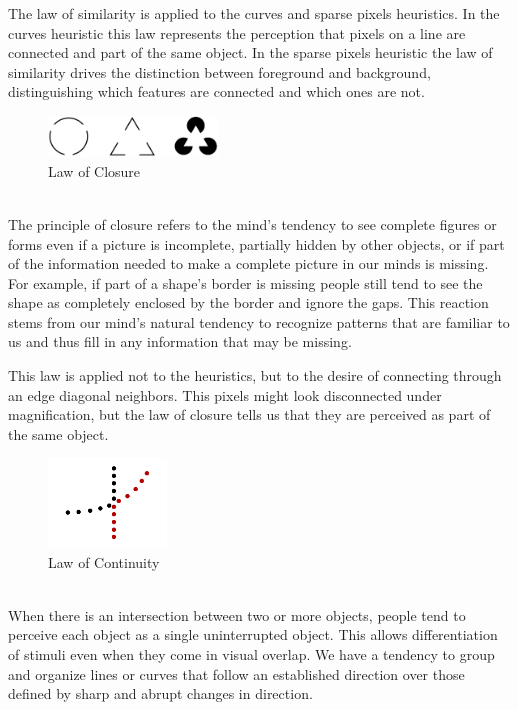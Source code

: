 \documentclass[]{usiinfbachelorproject}
\begin{document}
The law of similarity is applied to the curves and sparse pixels heuristics. In the curves heuristic this law represents the perception that pixels on a line are connected and part of the same object. In the sparse pixels heuristic the law of similarity drives the distinction between foreground and background, distinguishing which features are connected and which ones are not.\\

\begin{figure}
	\centering
	\vspace{0.5cm}
	\includegraphics[width=0.4\textwidth]{img/gestalt_closure.png}
	\caption*{Law of Closure}
\end{figure}

\\
The principle of closure refers to the mind's tendency to see complete figures or forms even if a picture is incomplete, partially hidden by other objects, or if part of the information needed to make a complete picture in our minds is missing. For example, if part of a shape's border is missing people still tend to see the shape as completely enclosed by the border and ignore the gaps. This reaction stems from our mind's natural tendency to recognize patterns that are familiar to us and thus fill in any information that may be missing.

This law is applied not to the heuristics, but to the desire of connecting through an edge diagonal neighbors. This pixels might look disconnected under magnification, but the law of closure tells us that they are perceived as part of the same object.\\

\begin{figure}
	\centering
	\includegraphics[width=0.28\textwidth]{img/gestalt_continuity.png}
	\caption*{Law of Continuity}
\end{figure}

\\
When there is an intersection between two or more objects, people tend to perceive each object as a single uninterrupted object. This allows differentiation of stimuli even when they come in visual overlap. We have a tendency to group and organize lines or curves that follow an established direction over those defined by sharp and abrupt changes in direction.
\end{document}
